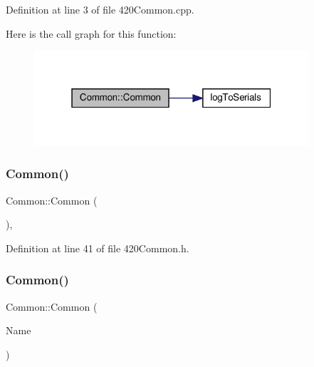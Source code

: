 Definition at line 3 of file 420\+Common.\+cpp.

Here is the call graph for this function\+:
\nopagebreak
\begin{figure}[H]
\begin{center}
\leavevmode
\includegraphics[width=289pt]{class_common_a1f240af5ca16ce9ff2195eadebb0e2a8_cgraph}
\end{center}
\end{figure}
\mbox{\label{class_common_ab0898f6608707a3e07c22d88ecdae661}} 
\subsubsection{\texorpdfstring{Common()}{Common()}\hspace{0.1cm}{\footnotesize\ttfamily [2/4]}}
{\footnotesize\ttfamily Common\+::\+Common (\begin{DoxyParamCaption}{ }\end{DoxyParamCaption})\hspace{0.3cm}{\ttfamily [inline]}, {\ttfamily [protected]}}



Definition at line 41 of file 420\+Common.\+h.

\mbox{\label{class_common_a1f240af5ca16ce9ff2195eadebb0e2a8}} 
\subsubsection{\texorpdfstring{Common()}{Common()}\hspace{0.1cm}{\footnotesize\ttfamily [3/4]}}
{\footnotesize\ttfamily Common\+::\+Common (\begin{DoxyParamCaption}\item[{const \+\_\+\+\_\+\+Flash\+String\+Helper $\ast$}]{Name }\end{DoxyParamCaption})\hspace{0.3cm}{\ttfamily [protected]}}

